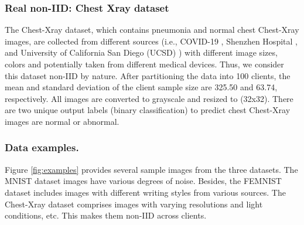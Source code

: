 \documentclass[journal]{IEEEtai}
\newcommand\parties{100}
\begin{document}
\subsubsection{Real non-IID: Chest Xray dataset}
The Chest-Xray dataset, which contains pneumonia and normal chest Chest-Xray images, are collected from different sources (i.e., COVID-19 \cite{covid19}, Shenzhen Hospital \cite{Shenzhen}, and University of California San Diego (UCSD) \cite{Kermany2018LabeledOC}) with different image sizes, colors and potentially taken from different medical devices. Thus, we consider this dataset non-IID by nature. After partitioning the data into \parties{} clients, the mean and standard deviation of the client sample size are 325.50 and 63.74, respectively. All images are converted to grayscale and resized to (32x32). There are two unique output labels (binary classification) to predict chest Chest-Xray images are normal or abnormal.

\subsubsection{Data examples.}
Figure \ref{fig:examples} provides several sample images from the three datasets. The MNIST dataset images have various degrees of noise. Besides, the FEMNIST dataset includes images with different writing styles from various sources. The Chest-Xray dataset comprises images with varying resolutions and light conditions, etc. This makes them non-IID across clients. 
\end{document}
